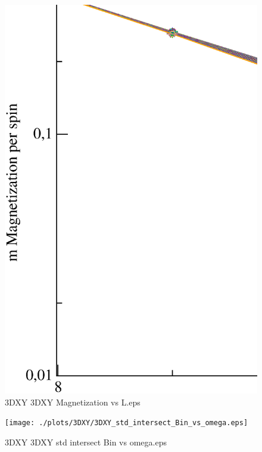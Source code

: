\begin{figure}[!htpb]
  \centering
  \includegraphics[width=\textwidth]{./plots/3DXY/3DXY_Magnetization_vs_L.eps}
  \caption{3DXY 3DXY Magnetization vs L.eps}
\end{figure}

\begin{figure}[!htpb]
  \centering
  \texttt{[image: ./plots/3DXY/3DXY\_std\_intersect\_Bin\_vs\_omega.eps]}
  \caption{3DXY 3DXY std intersect Bin vs omega.eps}
\end{figure}

